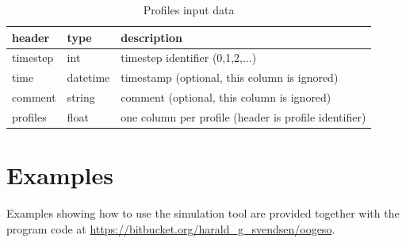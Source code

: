 \documentclass[12pt]{article}
\begin{document}
\begin{table}[h]
\caption{Profiles input data}
\begin{tabular}{lll}
	\hline
	header & type & description \\
	\hline
	timestep & int & timestep identifier (0,1,2,...) \\
	time & datetime & timestamp (optional, this column is ignored) \\
	comment & string & comment (optional, this column is ignored) \\
	profiles & float & one column per profile (header is profile identifier)\\
\end{tabular}
\end{table}


\section{Examples}

Examples showing how to use the simulation tool are provided together with the program code at
\url{https://bitbucket.org/harald_g_svendsen/oogeso}.





\printbibliography
\end{document}
